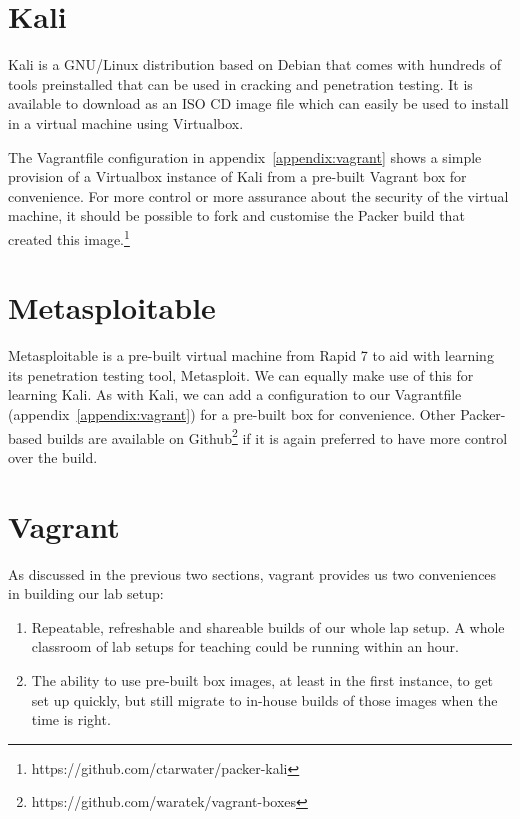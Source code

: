 \documentclass{report}
\begin{document}
\section{Kali}

Kali is a GNU/Linux distribution based on Debian that comes with hundreds
of tools preinstalled that can be used in cracking and penetration testing. It
is available to download as an ISO CD image file which can easily be used
to install in a virtual machine using Virtualbox.

The Vagrantfile configuration in appendix~\ref{appendix:vagrant} shows a
simple provision of a Virtualbox instance of Kali from a pre-built
Vagrant box for convenience. For more control or more assurance about the
security of the virtual machine, it should be possible to fork and customise
the Packer build that created this image.\footnote{https://github.com/ctarwater/packer-kali}

\section{Metasploitable}

Metasploitable is a pre-built virtual machine from Rapid 7 to aid with learning
its penetration testing tool, Metasploit. We can equally make use of this
for learning Kali. As with Kali, we can add a configuration to our Vagrantfile
(appendix~\ref{appendix:vagrant}) for a pre-built box for convenience. Other
Packer-based builds are available on Github\footnote{https://github.com/waratek/vagrant-boxes}
if it is again preferred to have more control over the build.

\section{Vagrant}

As discussed in the previous two sections, vagrant provides us two conveniences
in building our lab setup:

\begin{enumerate}
\item Repeatable, refreshable and shareable builds of our whole lap setup. A whole classroom
  of lab setups for teaching could be running within an hour.
\item The ability to use pre-built box images, at least in the first instance, to get set up
  quickly, but still migrate to in-house builds of those images when the time is right.
\end{enumerate}
\end{document}
